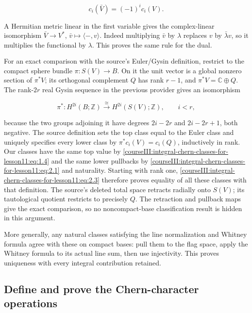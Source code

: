 \begin{equation}
c_i(\bar V)=(-1)^i c_i(V).
\label{courseIII:integral-chern-classes-for-lesson11:eq:2.2}
\end{equation}

A Hermitian metric linear in the first variable gives the complex-linear isomorphism \(\bar V\to V^*\), \(\bar v\mapsto\langle -,v\rangle\). Indeed multiplying \(\bar v\) by \(\lambda\) replaces \(v\) by \(\bar\lambda v\), so it multiplies the functional by \(\lambda\). This proves the same rule for the dual.

For an exact comparison with the source's Euler/Gysin definition, restrict to the compact sphere bundle \(\pi:S(V)\to B\). On it the unit vector is a global nonzero section of \(\pi^*V\); its orthogonal complement \(Q\) has rank \(r-1\), and \(\pi^*V=\mathbb C\oplus Q\). The rank-\(2r\) real Gysin sequence in the previous provider gives an isomorphism

\begin{equation}
\pi^*:H^{2i}(B;\mathbb Z)\xrightarrow{\cong}H^{2i}(S(V);\mathbb Z),\qquad i<r,
\label{courseIII:integral-chern-classes-for-lesson11:eq:2.3}
\end{equation}

because the two groups adjoining it have degrees \(2i-2r\) and \(2i-2r+1\), both negative. The source definition sets the top class equal to the Euler class and uniquely specifies every lower class by \(\pi^*c_i(V)=c_i(Q)\), inductively in rank. Our classes have the same top value by \eqref{courseIII:integral-chern-classes-for-lesson11:eq:1.4} and the same lower pullbacks by \eqref{courseIII:integral-chern-classes-for-lesson11:eq:2.1} and naturality. Starting with rank one, \eqref{courseIII:integral-chern-classes-for-lesson11:eq:2.3} therefore proves equality of all these classes with that definition. The source's deleted total space retracts radially onto \(S(V)\); its tautological quotient restricts to precisely \(Q\). The retraction and pullback maps give the exact comparison, so no noncompact-base classification result is hidden in this argument.

More generally, any natural classes satisfying the line normalization and Whitney formula agree with these on compact bases: pull them to the flag space, apply the Whitney formula to its actual line sum, then use injectivity. This proves uniqueness with every integral contribution retained.

\subsection{Define and prove the Chern-character operations}
\label{courseIII:integral-chern-classes-for-lesson11:character-operations}

